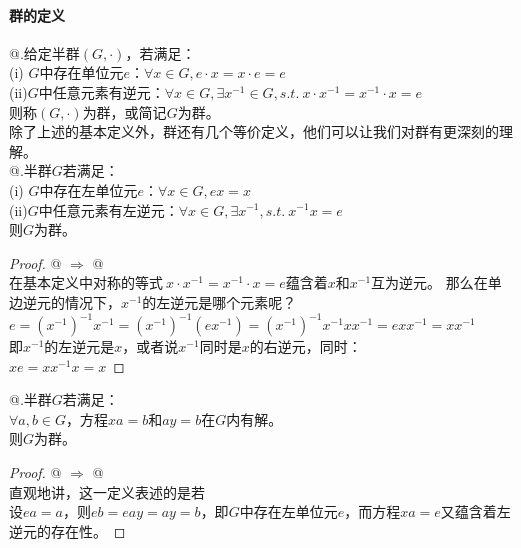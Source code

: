 \documentclass{article}
\makeatletter
\newcommand{\Rmnum}[1]{\expandafter\@slowromancap\romannumeral #1@}
\makeatother
\begin{document}
\paragraph{群的定义} \Rmnum{1}.给定半群$(G, \cdot)$，若满足：\\
(i) $G$中存在单位元$e$：$\forall x \in G, e \cdot x=x \cdot e=e$\\
(ii)$G$中任意元素有逆元：$\forall x \in G, \exists x^{-1} \in G, s.t.\ x\cdot x^{-1}=x^{-1} \cdot x=e$\\
则称$(G,\cdot)$为群，或简记$G$为群。\\
除了上述的基本定义外，群还有几个等价定义，他们可以让我们对群有更深刻的理解。\\

\Rmnum{2}.半群$G$若满足：\\
(i) $G$中存在左单位元$e$：$\forall x \in G, ex = x$\\
(ii)$G$中任意元素有左逆元：$\forall x \in G, \exists x^{-1},s.t.\ x^{-1}x = e$\\
则$G$为群。
\begin{proof}
    \Rmnum{2} $\Rightarrow$ \Rmnum{1}\\
    在基本定义中对称的等式$\ x\cdot x^{-1}=x^{-1} \cdot x=e$蕴含着$x$和$x^{-1}$互为逆元。
    那么在单边逆元的情况下，$x^{-1}$的左逆元是哪个元素呢？\\
    $e=(x^{-1})^{-1}x^{-1}=(x^{-1})^{-1}(ex^{-1})=(x^{-1})^{-1}x^{-1}xx^{-1}=exx^{-1}=xx^{-1}$\\
    即$x^{-1}$的左逆元是$x$，或者说$x^{-1}$同时是$x$的右逆元，同时：\\
    $xe=xx^{-1}x=x$
\end{proof}

\Rmnum{3}.半群$G$若满足：\\
$\forall a, b \in G$，方程$xa=b$和$ay=b$在$G$内有解。\\
则$G$为群。
\begin{proof}
    \Rmnum{3} $\Rightarrow$ \Rmnum{2}\\
    直观地讲，这一定义表述的是若\\
    设$ea=a$，则$eb=eay=ay=b$，即$G$中存在左单位元$e$，而方程$xa=e$又蕴含着左逆元的存在性。
\end{proof}
\end{document}
